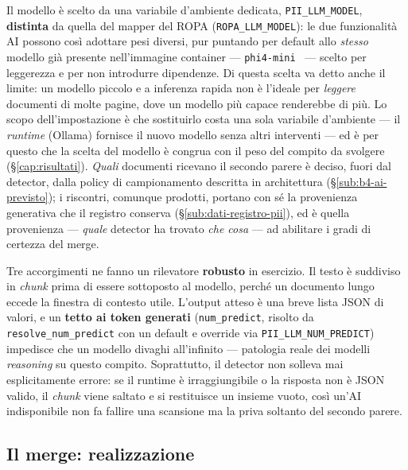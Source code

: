 Il modello è scelto da una variabile d'ambiente dedicata, \texttt{PII\_LLM\_MODEL}, \textbf{distinta} da quella del mapper del ROPA (\texttt{ROPA\_LLM\_MODEL}): le due funzionalità AI possono così adottare pesi diversi, pur puntando per default allo \emph{stesso} modello già presente nell'immagine container --- \texttt{phi4-mini}~\cite{abouelenin2025phi4mini} --- scelto per leggerezza e per non introdurre dipendenze. Di questa scelta va detto anche il limite: un modello piccolo e a inferenza rapida non è l'ideale per \emph{leggere} documenti di molte pagine, dove un modello più capace renderebbe di più. Lo scopo dell'impostazione è che sostituirlo costa una sola variabile d'ambiente --- il \emph{runtime} (Ollama) fornisce il nuovo modello senza altri interventi --- ed è per questo che la scelta del modello è congrua con il peso del compito da svolgere (§\ref{cap:risultati}). \emph{Quali} documenti ricevano il secondo parere è deciso, fuori dal detector, dalla policy di campionamento descritta in architettura (§\ref{sub:b4-ai-previsto}); i riscontri, comunque prodotti, portano con sé la provenienza generativa che il registro conserva (§\ref{sub:dati-registro-pii}), ed è quella provenienza --- \emph{quale} detector ha trovato \emph{che cosa} --- ad abilitare i gradi di certezza del merge.

Tre accorgimenti ne fanno un rilevatore \textbf{robusto} in esercizio. Il testo è suddiviso in \emph{chunk} prima di essere sottoposto al modello, perché un documento lungo eccede la finestra di contesto utile. L'output atteso è una breve lista JSON di valori, e un \textbf{tetto ai token generati} (\texttt{num\_predict}, risolto da \texttt{resolve\_num\_predict} con un default e override via \texttt{PII\_LLM\_NUM\_PREDICT}) impedisce che un modello divaghi all'infinito --- patologia reale dei modelli \emph{reasoning} su questo compito. Soprattutto, il detector non solleva mai esplicitamente errore: se il runtime è irraggiungibile o la risposta non è JSON valido, il \emph{chunk} viene saltato e si restituisce un insieme vuoto, così un'AI indisponibile non fa fallire una scansione ma la priva soltanto del secondo parere.

\subsection{Il merge: realizzazione}
\label{sub:impl-merge}

